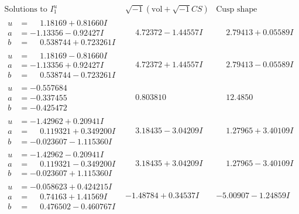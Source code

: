 \documentclass[1p]{elsarticle_modified}
\theoremstyle{definition}
\newcommand{\I}{\sqrt{-1}}
\begin{document}
$$\begin{array}{c|c|c}  
\text{Solutions to }I^u_{1}& \I (\text{vol} + \sqrt{-1}CS) & \text{Cusp shape}\\
 \hline 
\begin{aligned}
u &= \phantom{-}1.18169 + 0.81660 I \\
a &= -1.13356 - 0.92427 I \\
b &= \phantom{-}0.538744 + 0.723261 I\end{aligned}
 & \phantom{-}4.72372 - 1.44557 I & \phantom{-}2.79413 + 0.05589 I \\ \hline\begin{aligned}
u &= \phantom{-}1.18169 - 0.81660 I \\
a &= -1.13356 + 0.92427 I \\
b &= \phantom{-}0.538744 - 0.723261 I\end{aligned}
 & \phantom{-}4.72372 + 1.44557 I & \phantom{-}2.79413 - 0.05589 I \\ \hline\begin{aligned}
u &= -0.557684\phantom{ +0.000000I} \\
a &= -0.337455\phantom{ +0.000000I} \\
b &= -0.425472\phantom{ +0.000000I}\end{aligned}
 & \phantom{-}0.803810\phantom{ +0.000000I} & \phantom{-}12.4850\phantom{ +0.000000I} \\ \hline\begin{aligned}
u &= -1.42962 + 0.20941 I \\
a &= \phantom{-}0.119321 + 0.349200 I \\
b &= -0.023607 - 1.115360 I\end{aligned}
 & \phantom{-}3.18435 - 3.04209 I & \phantom{-}1.27965 + 3.40109 I \\ \hline\begin{aligned}
u &= -1.42962 - 0.20941 I \\
a &= \phantom{-}0.119321 - 0.349200 I \\
b &= -0.023607 + 1.115360 I\end{aligned}
 & \phantom{-}3.18435 + 3.04209 I & \phantom{-}1.27965 - 3.40109 I \\ \hline\begin{aligned}
u &= -0.058623 + 0.424215 I \\
a &= \phantom{-}0.74163 + 1.41569 I \\
b &= \phantom{-}0.476502 - 0.460767 I\end{aligned}
 & -1.48784 + 0.34537 I & -5.00907 - 1.24859 I \\ \hline\begin{aligned}

\end{aligned}
\end{array}$$
\end{document}

